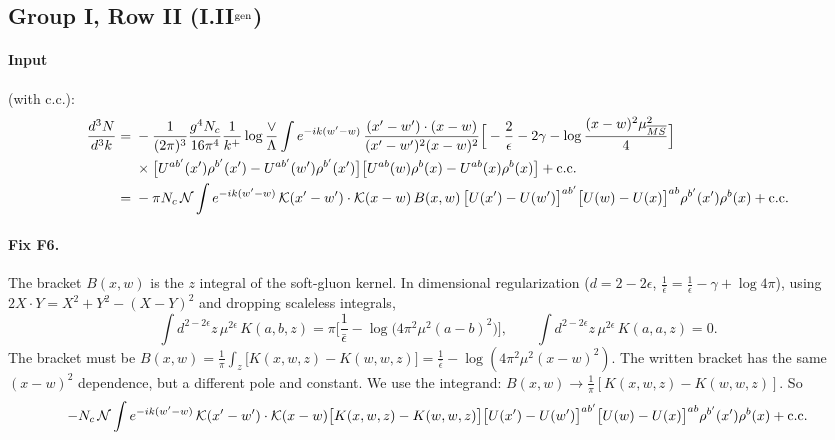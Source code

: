 \documentclass[10pt]{article}
\numberwithin{equation}{section}
\newcommand{\KK}{\mathcal K}
\newcommand{\NN}{\mathcal N}
\begin{document}
\subsection{Group I, Row II \texorpdfstring{(I.II$^{\rm gen}$)}{}}\label{src:g:I.II}
\paragraph{Input} (with c.c.):
\begin{align}
\frac{d^3N}{d^3k}={}&-\frac{1}{(2\pi)^3}\frac{g^4N_c}{16\pi^4}\frac1{k^+}\log\frac\vee\Lambda\int e^{-ik(w'-w)}\,\frac{(x'-w')\cdot(x-w)}{(x'-w')^2(x-w)^2}\Big[-\frac2\epsilon-2\gamma-\log\frac{(x-w)^2\mu^2_{\overline{MS}}}{4}\Big]\notag\\
&\times\big[U^{ab'}(x')\rho^{b'}(x')-U^{ab'}(w')\rho^{b'}(x')\big]\big[U^{ab}(w)\rho^b(x)-U^{ab}(x)\rho^b(x)\big]+{\rm c.c.}\notag\\
={}&-\pi N_c\,\NN\int e^{-ik(w'-w)}\,\KK(x'-w')\cdot\KK(x-w)\,B(x,w)\,\big[U(x')-U(w')\big]^{ab'}\big[U(w)-U(x)\big]^{ab}\rho^{b'}(x')\rho^b(x)+{\rm c.c.}
\end{align}
\paragraph{Fix F6.} The bracket $B(x,w)$ is the $z$ integral of the soft-gluon kernel. In dimensional regularization ($d=2-2\epsilon$, $\frac1{\bar\epsilon}=\frac1\epsilon-\gamma+\log4\pi$), using $2X\cdot Y=X^2+Y^2-(X-Y)^2$ and dropping scaleless integrals,
\begin{equation}
\int d^{2-2\epsilon}z\,\mu^{2\epsilon}\,K(a,b,z)=\pi\Big[\frac1{\bar\epsilon}-\log\big(4\pi^2\mu^2(a-b)^2\big)\Big],\qquad\int d^{2-2\epsilon}z\,\mu^{2\epsilon}\,K(a,a,z)=0 .
\label{eq:dimreg}
\end{equation}
The bracket must be $B(x,w)=\frac1\pi\int_z\big[K(x,w,z)-K(w,w,z)\big]=\frac1{\bar\epsilon}-\log(4\pi^2\mu^2(x-w)^2)$. The written bracket has the same $(x-w)^2$ dependence, but a different pole and constant. We use the integrand: $B(x,w)\to\frac1\pi[K(x,w,z)-K(w,w,z)]$. So
\begin{equation}
-N_c\,\NN\int e^{-ik(w'-w)}\,\KK(x'-w')\cdot\KK(x-w)\big[K(x,w,z)-K(w,w,z)\big]\big[U(x')-U(w')\big]^{ab'}\big[U(w)-U(x)\big]^{ab}\rho^{b'}(x')\rho^b(x)+{\rm c.c.}
\end{equation}
\end{document}
